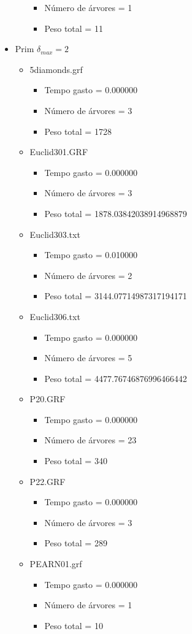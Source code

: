 \begin{itemize}
\begin{itemize}
\begin{itemize}
\item Número de árvores = 1
\item Peso total = 11
\end{itemize}
\end{itemize}
\item Prim $\delta_{max}=2$
\begin{itemize}
\item 5diamonds.grf
\begin{itemize}
\item Tempo gasto = 0.000000
\item Número de árvores = 3
\item Peso total = 1728
\end{itemize}
\item Euclid301.GRF
\begin{itemize}
\item Tempo gasto = 0.000000
\item Número de árvores = 3
\item Peso total = 1878.03842038914968879
\end{itemize}
\item Euclid303.txt
\begin{itemize}
\item Tempo gasto = 0.010000
\item Número de árvores = 2
\item Peso total = 3144.07714987317194171
\end{itemize}
\item Euclid306.txt
\begin{itemize}
\item Tempo gasto = 0.000000
\item Número de árvores = 5
\item Peso total = 4477.76746876996466442
\end{itemize}
\item P20.GRF
\begin{itemize}
\item Tempo gasto = 0.000000
\item Número de árvores = 23
\item Peso total = 340
\end{itemize}
\item P22.GRF
\begin{itemize}
\item Tempo gasto = 0.000000
\item Número de árvores = 3
\item Peso total = 289
\end{itemize}
\item PEARN01.grf
\begin{itemize}
\item Tempo gasto = 0.000000
\item Número de árvores = 1
\item Peso total = 10
\end{itemize}
\end{itemize}
\end{itemize}
